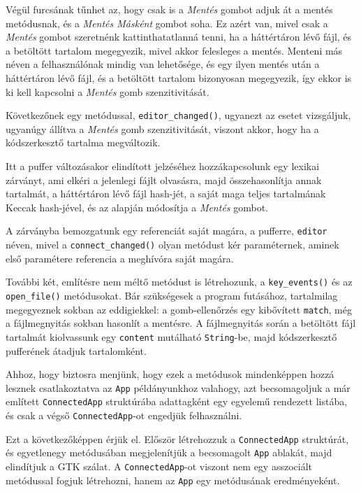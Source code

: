 Végül furcsának tűnhet az, hogy csak is a \textit{Mentés} gombot adjuk át a mentés metódusnak,
és a \textit{Mentés Másként} gombot soha.
Ez azért van, mivel csak a \textit{Mentés} gombot szeretnénk kattinthatatlanná tenni,
ha a háttértáron lévő fájl, és a betöltött tartalom megegyezik, mivel akkor felesleges a mentés.
Menteni más néven a felhasználónak mindig van lehetősége, és egy ilyen mentés után
a háttértáron lévő fájl, és a betöltött tartalom bizonyosan megegyezik, így ekkor is 
ki kell kapcsolni a \textit{Mentés} gomb szenzitivitását.

Következőnek egy metódussal, \texttt{editor\_changed()}, ugyanezt az esetet vizsgáljuk, ugyanúgy állítva a \textit{Mentés} gomb szenzitivitását,
viszont akkor, hogy ha a kódszerkesztő tartalma megváltozik. 



Itt a puffer változásakor elindított jelzéséhez hozzákapcsolunk egy lexikai zárványt,
ami elkéri a jelenlegi fájlt olvasásra, majd összehasonlítja annak tartalmát, a háttértáron lévő fájl hash-jét,
a saját maga teljes tartalmának Keccak hash-jével, és az alapján módosítja a \textit{Mentés} gombot.

A zárványba bemozgatunk egy referenciát saját magára, a pufferre, \texttt{editor} néven,
mivel a \texttt{connect\_changed()} olyan metódust kér paraméternek, aminek első paramétere
referencia a meghívóra saját magára.

További két, említésre nem méltő metódust is létrehozunk, a \texttt{key\_events()} és az \texttt{open\_file()} metódusokat.
Bár szükségesek a program futásához, tartalmilag megegyeznek sokban az eddigiekkel:
a gomb-ellenőrzés egy kibővített \texttt{match}, még a fájlmegnyitás sokban hasonlít a mentésre.
A fájlmegnyitás során a betöltött fájl tartalmát kiolvassunk egy \texttt{content} mutálható \texttt{String}-be,
majd kódszerkesztő pufferének átadjuk tartalomként.

Ahhoz, hogy biztosra menjünk, hogy ezek a metódusok mindenképpen hozzá lesznek csatlakoztatva
az \texttt{App} példányunkhoz valahogy, azt becsomagoljuk a már említett \texttt{ConnectedApp}
struktúrába adattagként egy egyelemű rendezett listába, és csak a végső \texttt{ConnectedApp}-ot
engedjük felhasználni.



Ezt a következőképpen érjük el. Először létrehozzuk a \texttt{ConnectedApp} struktúrát,
és egyetlenegy metódusában megjelenítjük a becsomagolt \texttt{App} ablakát, majd elindítjuk a GTK szálat.
A \texttt{ConnectedApp}-ot viszont nem egy asszociált metódussal fogjuk létrehozni,
hanem az \texttt{App} egy metódusának eredményeként.

